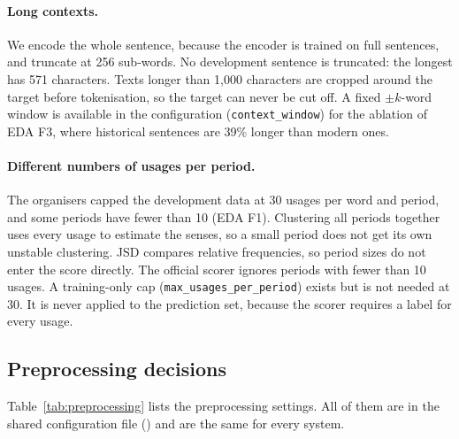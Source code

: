 \paragraph{Long contexts.} We encode the whole sentence, because the encoder is
trained on full sentences, and truncate at 256 sub-words. No development sentence
is truncated: the longest has 571 characters. Texts longer than 1{,}000
characters are cropped around the target before tokenisation, so the target can
never be cut off. A fixed $\pm k$-word window is available in the configuration
(\texttt{context\_window}) for the ablation of EDA F3, where historical sentences
are 39\% longer than modern ones.

\paragraph{Different numbers of usages per period.} The organisers capped the
development data at 30 usages per word and period, and some periods have fewer
than 10 (EDA F1). Clustering all periods together uses every usage to estimate
the senses, so a small period does not get its own unstable clustering. JSD
compares relative frequencies, so period sizes do not enter the score directly.
The official scorer ignores periods with fewer than 10 usages. A training-only
cap (\texttt{max\_usages\_per\_period}) exists but is not needed at 30. It is never
applied to the prediction set, because the scorer requires a label for every
usage.

\subsection{Preprocessing decisions}
\label{sec:approach-preprocessing}

Table~\ref{tab:preprocessing} lists the preprocessing settings. All of them are
in the shared configuration file () and are the same
for every system.

